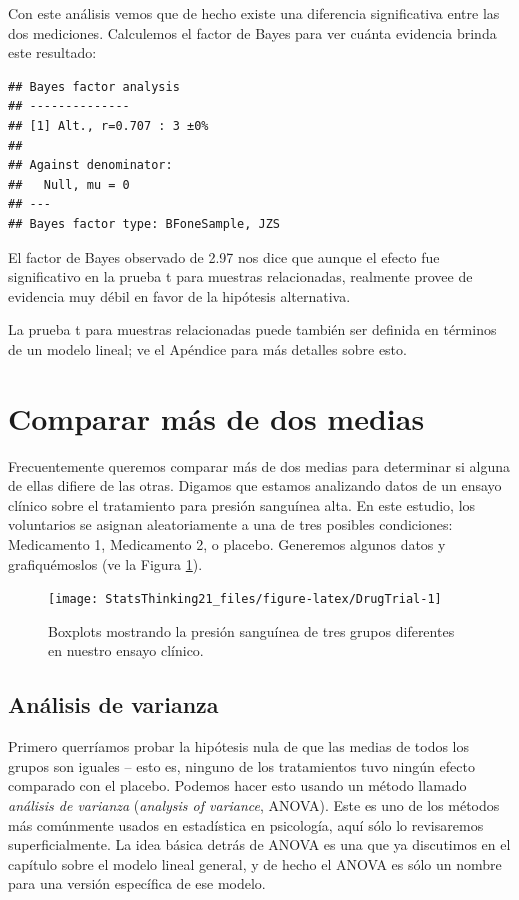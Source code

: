 \documentclass[
  12pt,
]{book}
\begin{document}
Con este análisis vemos que de hecho existe una diferencia significativa entre las dos mediciones. Calculemos el factor de Bayes para ver cuánta evidencia brinda este resultado:

\begin{verbatim}
## Bayes factor analysis
## --------------
## [1] Alt., r=0.707 : 3 ±0%
## 
## Against denominator:
##   Null, mu = 0 
## ---
## Bayes factor type: BFoneSample, JZS
\end{verbatim}

El factor de Bayes observado de 2.97 nos dice que aunque el efecto fue significativo en la prueba t para muestras relacionadas, realmente provee de evidencia muy débil en favor de la hipótesis alternativa.

La prueba t para muestras relacionadas puede también ser definida en términos de un modelo lineal; ve el Apéndice para más detalles sobre esto.

\hypertarget{comparar-muxe1s-de-dos-medias}{%
\section{Comparar más de dos medias}\label{comparar-muxe1s-de-dos-medias}}

Frecuentemente queremos comparar más de dos medias para determinar si alguna de ellas difiere de las otras. Digamos que estamos analizando datos de un ensayo clínico sobre el tratamiento para presión sanguínea alta. En este estudio, los voluntarios se asignan aleatoriamente a una de tres posibles condiciones: Medicamento 1, Medicamento 2, o placebo. Generemos algunos datos y grafiquémoslos (ve la Figura \ref{fig:DrugTrial}).

\begin{figure}
\texttt{[image: StatsThinking21\_files/figure-latex/DrugTrial-1]} \caption{Boxplots mostrando la presión sanguínea de tres grupos diferentes en nuestro ensayo clínico.}\label{fig:DrugTrial}
\end{figure}

\hypertarget{ANOVA}{%
\subsection{Análisis de varianza}\label{ANOVA}}

Primero querríamos probar la hipótesis nula de que las medias de todos los grupos son iguales -- esto es, ninguno de los tratamientos tuvo ningún efecto comparado con el placebo. Podemos hacer esto usando un método llamado \emph{análisis de varianza} (\emph{analysis of variance}, ANOVA). Este es uno de los métodos más comúnmente usados en estadística en psicología, aquí sólo lo revisaremos superficialmente. La idea básica detrás de ANOVA es una que ya discutimos en el capítulo sobre el modelo lineal general, y de hecho el ANOVA es sólo un nombre para una versión específica de ese modelo.
\end{document}
